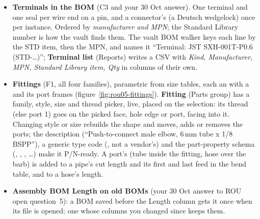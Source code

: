\begin{itemize}[nosep]
  \item \textbf{Terminals in the BOM} (C3 and your 30 Oct answer). One terminal and one seal per wire end on a pin,
        and a connector's  (a Deutsch wedgelock) once per instance. Ordered by
        \emph{manufacturer and MPN}; the Standard Library number is how the vault finds them. The vault BOM walker
        keys each line by the STD item, then the MPN, and names it ``Terminal: JST SXH-001T-P0.6 (STD-\dots)'';
        \textbf{Terminal list} (Reports) writes a CSV with \emph{Kind, Manufacturer, MPN, Standard Library item,
        Qty} in columns of their own.
  \item \textbf{Fittings} (F1, all four families), parametric from size tables, each an  with a
         and its port frames (figure~\ref{fig:rou05-fittings}). \textbf{Fitting} (Parts group)
        has a family, style, size and thread picker, live, placed on the selection: its thread (else port 1)
        goes on the picked face, hole edge or port, facing into it. Changing style or size rebuilds the shape and
        moves, adds or removes the ports; the description (``Push-to-connect male elbow, 6\,mm tube x 1/8 BSPP''),
        a generic type code (, not a vendor's) and the part-property schema
        (, , , \dots) make it P/N-ready. A port's
         (tube inside the fitting, hose over the barb) is added to a pipe's cut length and its
        first and last feed in the bend table, and to a hose's length.
  \item \textbf{Assembly BOM Length on old BOMs} (your 30 Oct answer to ROU open question~5): a BOM saved before
        the Length column gets it once when its file is opened; one whose columns you changed since keeps them.
\end{itemize}

